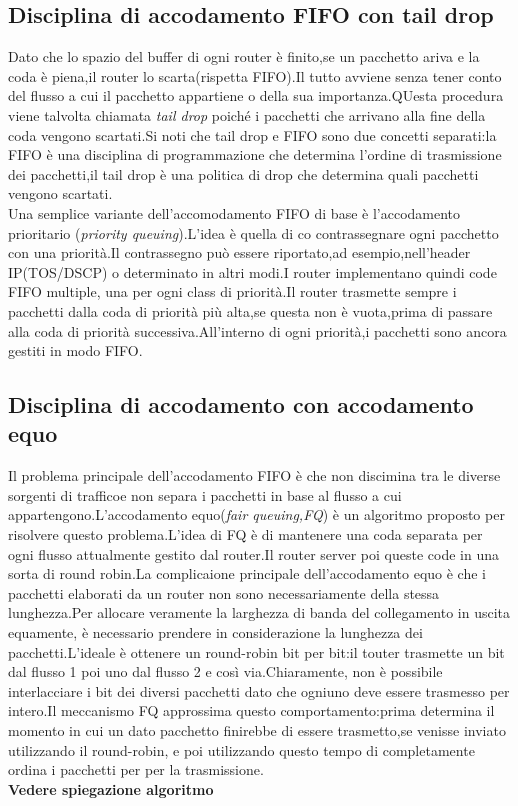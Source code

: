 \subsection{Disciplina di accodamento FIFO con tail drop}
Dato che lo spazio del buffer di ogni router è finito,se un pacchetto ariva e la coda è piena,il router lo scarta(rispetta FIFO).Il tutto avviene senza tener conto del flusso a cui il pacchetto appartiene o della sua importanza.QUesta procedura viene talvolta chiamata \textit{tail drop} poiché i pacchetti che arrivano alla fine della coda vengono scartati.Si noti che tail drop e FIFO sono due concetti separati:la FIFO è una disciplina di programmazione che determina l'ordine di trasmissione dei pacchetti,il tail drop è una politica di drop che determina quali pacchetti vengono scartati.\\
Una semplice variante dell'accomodamento FIFO di base è l'accodamento prioritario (\textit{priority queuing}).L'idea è quella di co contrassegnare ogni pacchetto con una priorità.Il contrassegno può essere riportato,ad esempio,nell'header IP(TOS/DSCP) o determinato in altri modi.I router implementano quindi code FIFO multiple, una per ogni class di priorità.Il router trasmette sempre i pacchetti dalla coda di priorità più alta,se questa non è vuota,prima di passare alla coda di priorità successiva.All'interno di ogni priorità,i pacchetti sono ancora gestiti in modo FIFO.
\subsection{Disciplina di accodamento con accodamento equo}
Il problema principale dell'accodamento FIFO è che non discimina tra le diverse sorgenti di trafficoe non separa i pacchetti in base al flusso a cui appartengono.L'accodamento equo(\textit{fair queuing,FQ}) è un algoritmo proposto per risolvere questo problema.L'idea di FQ è di mantenere una coda separata per ogni flusso attualmente gestito dal router.Il router server poi queste code in una sorta di round robin.La complicaione principale dell'accodamento equo è che i pacchetti elaborati da un router non sono necessariamente della stessa lunghezza.Per allocare veramente la larghezza di banda del collegamento in uscita equamente, è necessario prendere in considerazione la lunghezza dei pacchetti.L'ideale è ottenere un round-robin bit per bit:il touter trasmette un bit dal flusso 1 poi uno dal flusso 2 e così via.Chiaramente, non è possibile interlacciare i bit dei diversi pacchetti dato che ogniuno deve essere trasmesso per intero.Il meccanismo FQ approssima questo comportamento:prima determina il momento in cui un dato pacchetto finirebbe di essere trasmetto,se venisse inviato utilizzando il round-robin, e poi utilizzando questo tempo di completamente ordina i pacchetti per per la trasmissione.\\
\textbf{Vedere spiegazione algoritmo}
